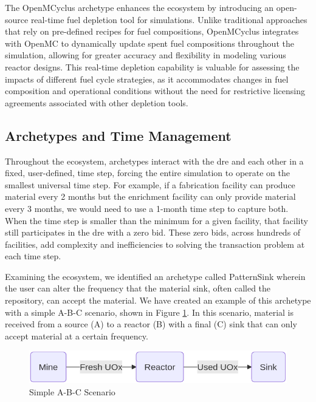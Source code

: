 The OpenMCyclus archetype \cite{openmcyclus_paper} enhances the \cyclus
ecosystem by introducing an open-source real-time fuel depletion tool for
\cyclus simulations. Unlike traditional approaches that rely on pre-defined
recipes for fuel compositions, OpenMCyclus integrates with OpenMC
\cite{romano_openmc_2015} to dynamically update spent fuel compositions
throughout the simulation, allowing for greater accuracy and flexibility in
modeling various reactor designs. This real-time depletion capability is
valuable for assessing the impacts of different fuel cycle strategies, as it
accommodates changes in fuel composition and operational conditions without the
need for restrictive licensing agreements associated with other depletion tools.

\subsection{Archetypes and Time Management}
\label{sec:archetypes_and_time_management}

Throughout the \cyclus ecosystem, archetypes interact with the \gls{dre} and
each other in a fixed, user-defined, time step, forcing the entire simulation
to operate on the smallest universal time step. For example, if a fabrication
facility can produce material every 2 months but the enrichment facility can
only provide material every 3 months, we would need to use a 1-month time step
to capture both. When the time step is smaller than the minimum for a given
facility, that facility still participates in the \gls{dre} with a zero bid.
These zero bids, across hundreds of facilities, add complexity and
inefficiencies to solving the transaction problem at each time step.

Examining the \cyclus ecosystem, we identified an archetype called PatternSink
wherein the user can alter the frequency that the material sink, often called
the repository, can accept the material. We have created an example of this
archetype with a simple A-B-C scenario, shown in Figure \ref{fig:a-b-c}. In
this scenario, material is received from a source (A) to a reactor (B) with a
final (C) sink that can only accept material at a certain frequency.

\begin{figure}[!ht]
    \centering
    \includegraphics[scale=0.4]{images/cyclus/a-b-c.png}
    \caption{Simple A-B-C Scenario}
    \label{fig:a-b-c}
\end{figure}

